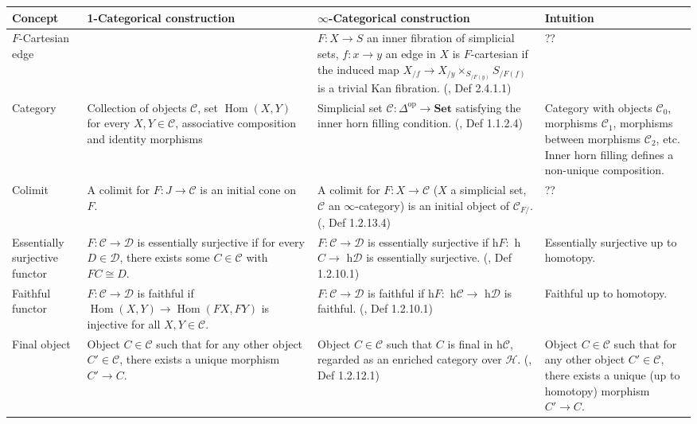 \documentclass{article}
\DeclareMathOperator{\Hom}{Hom}
\begin{document}
\DeclarePairedDelimiter{\norm}{\lVert}{\rVert} 
\DeclarePairedDelimiter{\abs}{\lvert}{\rvert} 
\DeclarePairedDelimiter{\ang}{\langle}{\rangle} 

\begin{centre}
\begin{longtable}{ |p{3cm}||p{5.2cm}|p{5.2cm}|p{5cm}|  }
 \hline
 Concept& 1-Categorical construction & \(\infty\)-Categorical construction &Intuition\\
 \hline\hline
  \(F\)-Cartesian edge & & \(F : X \to S \) an inner fibration of simplicial sets, \(f : x\to y \) an edge in \(X\) is \(F\)-cartesian if the induced map \(X_{/f}\to X_{/y}\times_{S_{/F(y)}}S_{/F(f)}\) is a trivial Kan fibration. (\autocite{htt}, Def 2.4.1.1)& ??\\
\hline
 Category & Collection of objects \(\mathcal{C}\), set \(\Hom(X, Y)\) for every \(X, Y\in \mathcal{C}\), associative composition and identity morphisms & Simplicial set \(\mathcal{C} : \Delta^\text{op} \to \textbf{Set}\) satisfying the inner horn filling condition. (\autocite{htt}, Def 1.1.2.4)& Category with objects \(\mathcal{C}_0\), morphisms \(\mathcal{C}_1\), morphisms between morphisms \(\mathcal{C}_2\), etc. Inner horn filling defines a non-unique composition. \\
 \hline
 Colimit & A colimit for \(F : J \to \mathcal{C}\) is an initial cone on \(F\). & A colimit for \(F : X\to \mathcal{C} \) (\(X\) a simplicial set, \(\mathcal{C}\) an \(\infty\)-category) is an initial object of \(\mathcal{C}_{F/}\). (\autocite{htt}, Def 1.2.13.4) & ??\\
\hline
Essentially surjective functor & \(F : \mathcal{C} \to \mathcal{D}\) is essentially surjective if for every \(D \in \mathcal{D}\), there exists some \(C \in \mathcal{C}\) with \(FC \cong D\). & \(F : \mathcal{C} \to \mathcal{D}\) is essentially surjective if h\(F :\) h\(C \to\) h\(\mathcal{D}\) is essentially surjective. (\autocite{htt}, Def 1.2.10.1) & Essentially surjective up to homotopy.\\
\hline
Faithful functor & \(F : \mathcal{C} \to \mathcal{D}\) is faithful if \(\Hom(X,Y)\to \Hom(FX, FY)\) is injective for all \(X,Y \in \mathcal{C}\). & \(F : \mathcal{C} \to \mathcal{D}\) is faithful if h\(F :\) h\(\mathcal{C} \to\) h\(\mathcal{D}\) is faithful. (\autocite{htt}, Def 1.2.10.1) & Faithful up to homotopy.\\
\hline
 Final object & Object \(C\in \mathcal{C} \) such that for any other object \(C' \in \mathcal{C}\), there exists a unique morphism \(C' \to C\). & Object \(C \in \mathcal{C}\) such that \(C\) is final in h\(\mathcal{C}\), regarded as an enriched category over \(\mathcal{H}\).  (\autocite{htt}, Def 1.2.12.1) & Object \(C\in \mathcal{C}\) such that for any other object \(C' \in \mathcal{C}\), there exists a unique (up to homotopy) morphism \(C' \to C\).\\

\end{longtable}
\end{centre}
\end{document}
